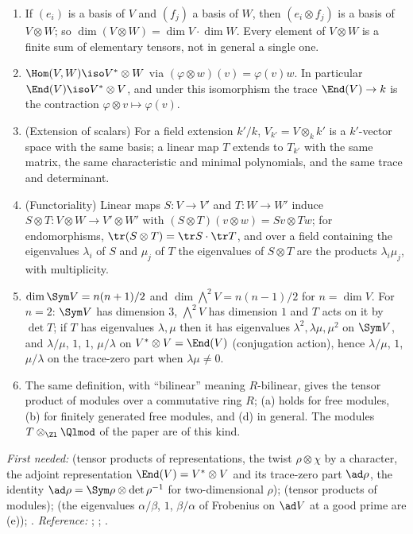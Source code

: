 \begin{theorem}\label{thm:prereq:tensor}
\begin{enumerate}[label=(\alph*)]
\item If $(e_i)$ is a basis of $V$ and $(f_j)$ a basis of $W$, then $(e_i\otimes f_j)$ is a basis
of $V\otimes W$; so $\dim(V\otimes W)=\dim V\cdot\dim W$. Every element of $V\otimes W$ is a finite
sum of elementary tensors, not in general a single one.
\item $\Hom(V,W)\iso V^*\otimes W$ via $(\varphi\otimes w)(v)=\varphi(v)w$. In particular
$\End(V)\iso V^*\otimes V$, and under this isomorphism the trace $\End(V)\to k$ is the contraction
$\varphi\otimes v\mapsto\varphi(v)$.
\item (Extension of scalars) For a field extension $k'/k$, $V_{k'}=V\otimes_kk'$ is a $k'$-vector
space with the same basis; a linear map $T$ extends to $T_{k'}$ with the same matrix, the same
characteristic and minimal polynomials, and the same trace and determinant.
\item (Functoriality) Linear maps $S\colon V\to V'$ and $T\colon W\to W'$ induce
$S\otimes T\colon V\otimes W\to V'\otimes W'$ with $(S\otimes T)(v\otimes w)=Sv\otimes Tw$; for
endomorphisms, $\tr(S\otimes T)=\tr S\cdot\tr T$, and over a field containing the eigenvalues
$\lambda_i$ of $S$ and $\mu_j$ of $T$ the eigenvalues of $S\otimes T$ are the products
$\lambda_i\mu_j$, with multiplicity.
\item $\dim\Sym V=n(n+1)/2$ and $\dim\bigwedge^2V=n(n-1)/2$ for $n=\dim V$. For $n=2$: $\Sym V$ has
dimension $3$, $\bigwedge^2V$ has dimension $1$ and $T$ acts on it by $\det T$; if $T$ has
eigenvalues $\lambda,\mu$ then it has eigenvalues $\lambda^2,\lambda\mu,\mu^2$ on $\Sym V$, and
$\lambda/\mu$, $1$, $1$, $\mu/\lambda$ on $V^*\otimes V=\End(V)$ (conjugation action), hence
$\lambda/\mu$, $1$, $\mu/\lambda$ on the trace-zero part when $\lambda\mu\ne0$.
\item The same definition, with ``bilinear'' meaning $R$-bilinear, gives the tensor product of
modules over a commutative ring $R$; (a) holds for free modules, (b) for finitely generated free
modules, and (d) in general. The modules $T\otimes_{\Zl}\Qlmod$ of the paper are of this kind.
\end{enumerate}
\end{theorem}
\noindent\emph{First needed:}  (tensor products of representations, the twist
$\rho\otimes\chi$ by a character, the adjoint representation $\End(V)=V^*\otimes V$ and its
trace-zero part $\ad\rho$, the identity $\ad\rho=\Sym\rho\otimes\det\rho^{-1}$ for
two-dimensional $\rho$);  (tensor products of modules); 
(the eigenvalues $\alpha/\beta$, $1$, $\beta/\alpha$ of Frobenius on $\ad V$ at a good prime are
(e)); . \emph{Reference:} \cite[Chapter XVI]{Lang};
\cite[Sections 10.4 and 11.5]{DummitFoote}; \cite{Halmos74}.

